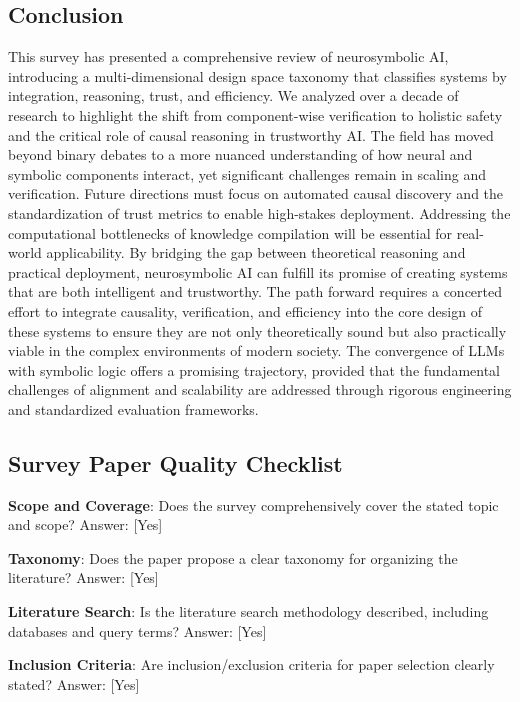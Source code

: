 \documentclass{article}
\begin{document}
\subsection{Conclusion}

\label{sec:conclusion}

This survey has presented a comprehensive review of neurosymbolic AI, introducing a multi-dimensional design space taxonomy that classifies systems by integration, reasoning, trust, and efficiency. We analyzed over a decade of research to highlight the shift from component-wise verification to holistic safety and the critical role of causal reasoning in trustworthy AI. The field has moved beyond binary debates to a more nuanced understanding of how neural and symbolic components interact, yet significant challenges remain in scaling and verification. Future directions must focus on automated causal discovery and the standardization of trust metrics to enable high-stakes deployment. Addressing the computational bottlenecks of knowledge compilation will be essential for real-world applicability. By bridging the gap between theoretical reasoning and practical deployment, neurosymbolic AI can fulfill its promise of creating systems that are both intelligent and trustworthy. The path forward requires a concerted effort to integrate causality, verification, and efficiency into the core design of these systems to ensure they are not only theoretically sound but also practically viable in the complex environments of modern society. The convergence of LLMs with symbolic logic offers a promising trajectory, provided that the fundamental challenges of alignment and scalability are addressed through rigorous engineering and standardized evaluation frameworks.

\subsection{Survey Paper Quality Checklist}

\label{sec:survey_paper_quality_checklist}

\textbf{Scope and Coverage}: Does the survey comprehensively cover the stated topic and scope?
Answer: [Yes]

\textbf{Taxonomy}: Does the paper propose a clear taxonomy for organizing the literature?
Answer: [Yes]

\textbf{Literature Search}: Is the literature search methodology described, including databases and query terms?
Answer: [Yes]

\textbf{Inclusion Criteria}: Are inclusion/exclusion criteria for paper selection clearly stated?
Answer: [Yes]
\end{document}
